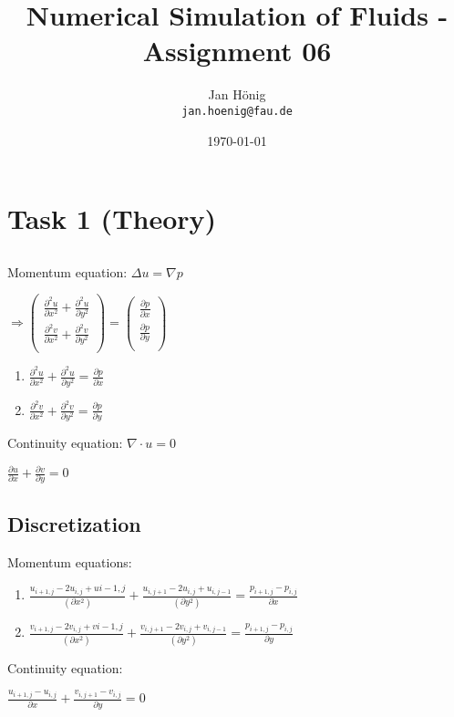 \documentclass[a4paper,11pt]{scrartcl}
\title{Numerical Simulation of Fluids - Assignment 06}
\author{Jan H\"onig \\ \texttt{jan.hoenig@fau.de}}
\date{\today}
\begin{document}
\maketitle


\section{Task 1 (Theory)}
\subsection{}
Momentum equation:  $\Delta u = \nabla p$

$ \Rightarrow
   \begin{pmatrix}
      \frac{\partial^2 u}{\partial x^2} + \frac{\partial^2 u}{\partial y^2} \\
      \frac{\partial^2 v}{\partial x^2} + \frac{\partial^2 v}{\partial y^2} \\
   \end{pmatrix}
   =
   \begin{pmatrix}
      \frac{\partial p}{\partial x} \\
      \frac{\partial p}{\partial y} \\
   \end{pmatrix}
$
\begin{enumerate}
   \item $\frac{\partial^2 u}{\partial x^2} + \frac{\partial^2 u}{\partial y^2} = \frac{\partial p}{\partial x}$
   \item $\frac{\partial^2 v}{\partial x^2} + \frac{\partial^2 v}{\partial y^2} = \frac{\partial p}{\partial y}$
\end{enumerate}

Continuity equation: $\nabla \cdot u = 0$

$\frac{\partial u}{\partial x} + \frac{\partial v}{\partial y} = 0$

\subsection{Discretization}
Momentum equations:
\begin{enumerate}
   \item $\frac{u_{i+1,j} - 2u_{i,j} + u{i-1,j}}{(\partial x^2)} + \frac{u_{i,j+1} - 2u_{i,j} + u_{i,j-1}}{(\partial y^2)} = \frac{p_{i+1,j} - p_{i,j}}{\partial x}$
   \item $\frac{v_{i+1,j} - 2v_{i,j} + v{i-1,j}}{(\partial x^2)} + \frac{v_{i,j+1} - 2v_{i,j} + v_{i,j-1}}{(\partial y^2)} = \frac{p_{i+1,j} - p_{i,j}}{\partial y}$
\end{enumerate}

Continuity equation:

$ \frac{u_{i+1,j} - u_{i,j}}{\partial x} + \frac{v_{i,j+1} - v_{i,j}}{\partial y} = 0 $
\end{document}
